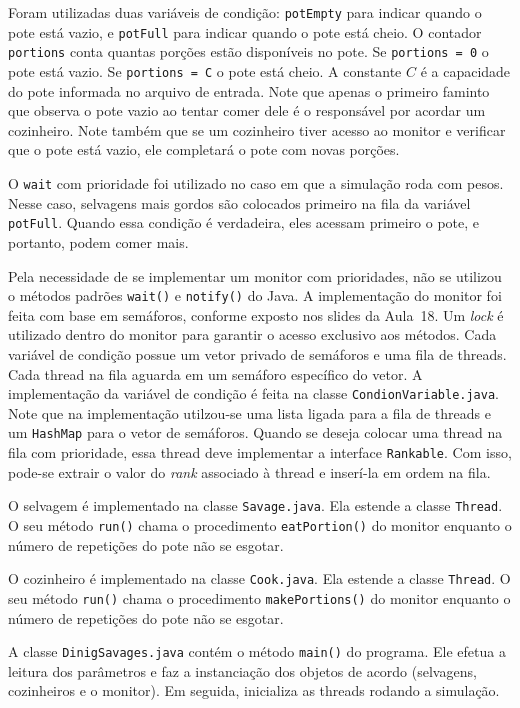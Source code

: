 \documentclass[11pt,a4paper]{article}
\begin{document}
Foram utilizadas duas variáveis de condição: \verb|potEmpty| para indicar quando o pote está vazio, 
e \verb|potFull| para indicar quando o pote está cheio. O contador \verb|portions| conta quantas 
porções estão disponíveis no pote. Se \verb|portions = 0| o pote está vazio. Se 
\verb|portions = C| o pote está cheio. A constante $C$ é a capacidade do pote informada no arquivo 
de entrada. Note que apenas o primeiro faminto que observa o pote vazio ao tentar comer dele é o 
responsável por acordar um cozinheiro. Note também que se um cozinheiro tiver acesso ao monitor e 
verificar que o pote está vazio, ele completará o pote com novas porções. 

O \verb|wait| com prioridade foi utilizado no caso em que a simulação roda com pesos. Nesse caso, 
selvagens mais gordos são colocados primeiro na fila da variável \verb|potFull|. Quando essa 
condição é verdadeira, eles acessam primeiro o pote, e portanto, podem comer mais.

Pela necessidade de se implementar um monitor com prioridades, não se utilizou o métodos padrões
\verb|wait()| e \verb|notify()| do Java. A implementação do monitor foi feita com base em semáforos,
conforme exposto nos slides da Aula~18. Um {\it lock} é utilizado dentro do  monitor para garantir o
acesso exclusivo aos métodos. Cada variável de condição possue um vetor  privado de semáforos e uma
fila de threads. Cada thread na fila aguarda em um semáforo específico do  vetor. A implementação da
variável de condição é feita na classe \verb|CondionVariable.java|. Note  que na implementação
utilzou-se uma lista ligada para a fila de threads e um \verb|HashMap| para o vetor de semáforos.
Quando se deseja colocar uma thread na fila com prioridade, essa thread deve  implementar a
interface \verb|Rankable|. Com isso, pode-se extrair o valor do {\it rank} associado à thread e
inserí-la em ordem na fila.

O selvagem é implementado na classe \verb|Savage.java|. Ela estende a classe \verb|Thread|. O seu 
método \verb|run()| chama o procedimento \verb|eatPortion()| do monitor enquanto o número de 
repetições do pote não se esgotar.

O cozinheiro é implementado na classe \verb|Cook.java|. Ela estende a classe \verb|Thread|. O seu 
método \verb|run()| chama o procedimento \verb|makePortions()| do monitor enquanto o número de 
repetições do pote não se esgotar.

A classe \verb|DinigSavages.java| contém o método \verb|main()| do programa. Ele efetua a leitura
dos parâmetros e faz a instanciação dos objetos de acordo (selvagens, cozinheiros e o monitor). 
Em seguida, inicializa as threads rodando a simulação.
\end{document}
